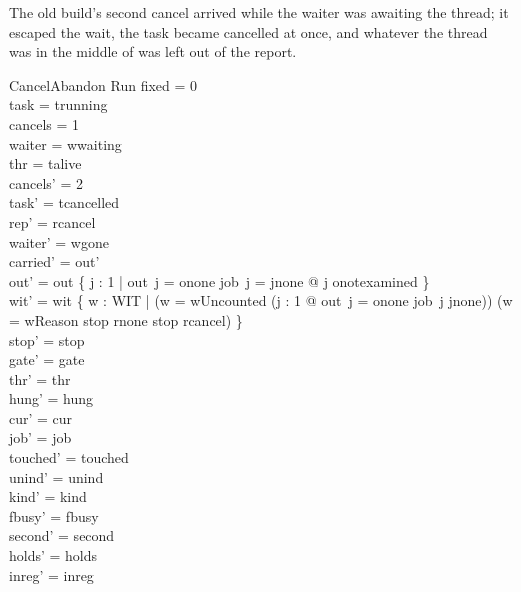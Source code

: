 \documentclass[a4paper,10pt,fleqn]{article}
\begin{document}
The old build's second cancel arrived while the waiter was awaiting the thread;
it escaped the wait, the task became cancelled at once, and whatever the thread
was in the middle of was left out of the report.

\begin{schema}{CancelAbandon}
\Delta Run
\where
fixed = 0 \\
task = trunning \\
cancels = 1 \\
waiter = wwaiting \\
thr = talive \\
cancels' = 2 \\
task' = tcancelled \\
rep' = rcancel \\
waiter' = wgone \\
carried' = out' \\
out' = out \oplus \{ j : 1  | out~j = onone \land job~j = jnone @
  j \mapsto onotexamined \} \\
wit' = wit \cup \{ w : WIT |
  (w = wUncounted \land (\exists j : 1  @ out~j = onone \land job~j \neq jnone))
  \lor (w = wReason \land stop \neq rnone \land stop \neq rcancel) \} \\
stop' = stop \\
gate' = gate \\
thr' = thr \\
hung' = hung \\
cur' = cur \\
job' = job \\
touched' = touched \\
unind' = unind \\
kind' = kind \\
fbusy' = fbusy \\
second' = second \\
holds' = holds \\
inreg' = inreg
\end{schema}
\end{document}
